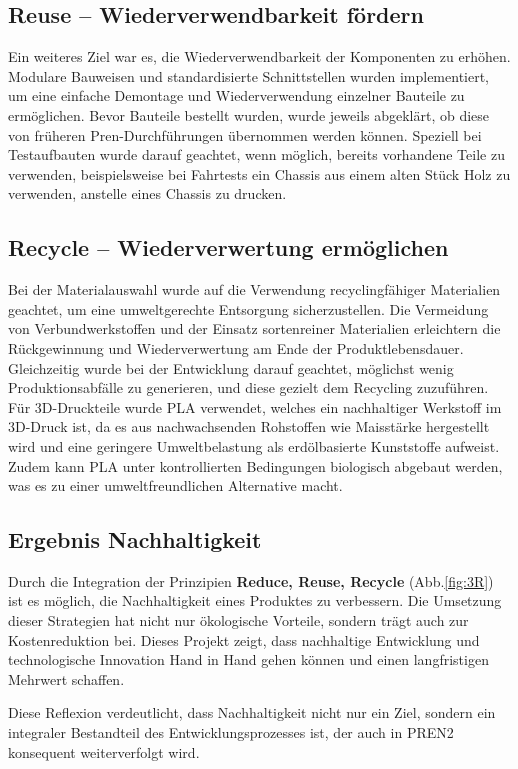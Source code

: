 \documentclass[../main.tex]{subfiles}
\begin{document}
\subsection{Reuse – Wiederverwendbarkeit fördern}

Ein weiteres Ziel war es, die Wiederverwendbarkeit der Komponenten zu erhöhen. Modulare Bauweisen und standardisierte Schnittstellen wurden implementiert, um eine einfache Demontage und Wiederverwendung einzelner Bauteile zu ermöglichen. Bevor Bauteile bestellt wurden, wurde jeweils abgeklärt, ob diese von früheren Pren-Durchführungen übernommen werden können. Speziell bei Testaufbauten wurde darauf geachtet, wenn möglich, bereits vorhandene Teile zu verwenden, beispielsweise bei Fahrtests ein Chassis aus einem alten Stück Holz zu verwenden, anstelle eines Chassis zu drucken.

\subsection{Recycle – Wiederverwertung ermöglichen}

Bei der Materialauswahl wurde auf die Verwendung recyclingfähiger Materialien geachtet, um eine umweltgerechte Entsorgung sicherzustellen. Die Vermeidung von Verbundwerkstoffen und der Einsatz sortenreiner Materialien erleichtern die Rückgewinnung und Wiederverwertung am Ende der Produktlebensdauer. Gleichzeitig wurde bei der Entwicklung darauf geachtet, möglichst wenig Produktionsabfälle zu generieren, und diese gezielt dem Recycling zuzuführen. Für 3D-Druckteile wurde PLA verwendet, welches ein nachhaltiger Werkstoff im 3D-Druck ist, da es aus nachwachsenden Rohstoffen wie Maisstärke hergestellt wird und eine geringere Umweltbelastung als erdölbasierte Kunststoffe aufweist. Zudem kann PLA unter kontrollierten Bedingungen biologisch abgebaut werden, was es zu einer umweltfreundlichen Alternative macht.

\subsection{Ergebnis Nachhaltigkeit}

Durch die Integration der Prinzipien \textbf{Reduce, Reuse, Recycle} (Abb.\ref{fig:3R}) ist es möglich, die Nachhaltigkeit eines Produktes zu verbessern. Die Umsetzung dieser Strategien hat nicht nur ökologische Vorteile, sondern trägt auch zur Kostenreduktion bei. Dieses Projekt zeigt, dass nachhaltige Entwicklung und technologische Innovation Hand in Hand gehen können und einen langfristigen Mehrwert schaffen.

Diese Reflexion verdeutlicht, dass Nachhaltigkeit nicht nur ein Ziel, sondern ein integraler Bestandteil des Entwicklungsprozesses ist, der auch in PREN2 konsequent weiterverfolgt wird.
\end{document}
